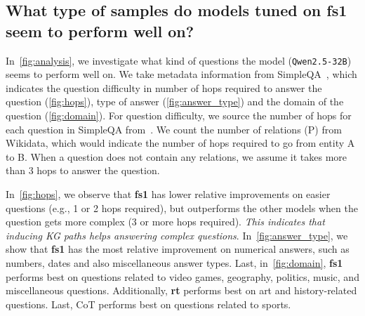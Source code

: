 \documentclass[11pt]{article}
\newcommand{\dataset}{\textbf{fs1}}
\newcommand{\datasetrt}{\textbf{\textbf{rt}}}
\begin{document}
\subsection{What type of samples do models tuned on \dataset{} seem to perform well on?}

In~\cref{fig:analysis}, we investigate what kind of questions the model (\texttt{Qwen2.5-32B}) seems to perform well on. 
We take metadata information from SimpleQA~\citep{wei2024measuring}, which indicates the question difficulty in number of hops required to answer the question (\cref{fig:hops}), type of answer (\cref{fig:answer_type}) and the domain of the question (\cref{fig:domain}). 
For question difficulty, we source the number of hops for each question in SimpleQA from~\citet{lavrinovics2025multihalmultilingualdatasetknowledgegraph}. 
We count the number of relations (P) from Wikidata, which would indicate the number of hops required to go from entity A to B. When a question does not contain any relations, we assume it takes more than 3 hops to answer the question.

In~\cref{fig:hops}, we observe that \dataset{} has lower relative improvements on easier questions (e.g., 1 or 2 hops required), but outperforms the other models when the question gets more complex (3 or more hops required). 
\emph{This indicates that inducing KG paths helps answering complex questions}.
In~\cref{fig:answer_type}, we show that \dataset{} has the most relative improvement on numerical answers, such as numbers, dates and also miscellaneous answer types.
Last, in~\cref{fig:domain}, \dataset{} performs best on questions related to video games, geography, politics, music, and miscellaneous questions. Additionally, \datasetrt{} performs best on art and history-related questions. Last, CoT performs best on questions related to sports.

\begin{center}
%
\end{center}
\end{document}
